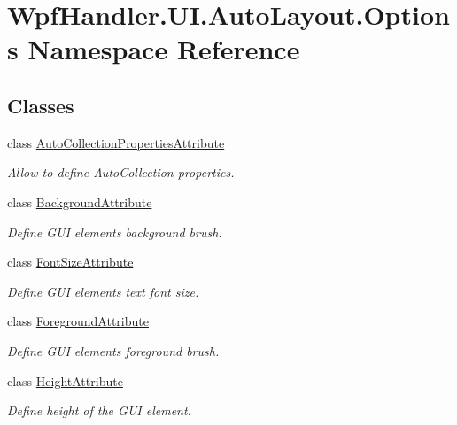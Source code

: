 \hypertarget{namespace_wpf_handler_1_1_u_i_1_1_auto_layout_1_1_options}{}\section{Wpf\+Handler.\+U\+I.\+Auto\+Layout.\+Options Namespace Reference}
\label{namespace_wpf_handler_1_1_u_i_1_1_auto_layout_1_1_options}
\subsection*{Classes}
\begin{DoxyCompactItemize}
\item 
class \mbox{\hyperlink{class_wpf_handler_1_1_u_i_1_1_auto_layout_1_1_options_1_1_auto_collection_properties_attribute}{Auto\+Collection\+Properties\+Attribute}}
\begin{DoxyCompactList}\small\item\em Allow to define Auto\+Collection properties. \end{DoxyCompactList}\item 
class \mbox{\hyperlink{class_wpf_handler_1_1_u_i_1_1_auto_layout_1_1_options_1_1_background_attribute}{Background\+Attribute}}
\begin{DoxyCompactList}\small\item\em Define G\+UI element\textquotesingle{}s background brush. \end{DoxyCompactList}\item 
class \mbox{\hyperlink{class_wpf_handler_1_1_u_i_1_1_auto_layout_1_1_options_1_1_font_size_attribute}{Font\+Size\+Attribute}}
\begin{DoxyCompactList}\small\item\em Define G\+UI element\textquotesingle{}s text font size. \end{DoxyCompactList}\item 
class \mbox{\hyperlink{class_wpf_handler_1_1_u_i_1_1_auto_layout_1_1_options_1_1_foreground_attribute}{Foreground\+Attribute}}
\begin{DoxyCompactList}\small\item\em Define G\+UI element\textquotesingle{}s foreground brush. \end{DoxyCompactList}\item 
class \mbox{\hyperlink{class_wpf_handler_1_1_u_i_1_1_auto_layout_1_1_options_1_1_height_attribute}{Height\+Attribute}}
\begin{DoxyCompactList}\small\item\em Define height of the G\+UI element. \end{DoxyCompactList}\item 

\end{DoxyCompactItemize}
